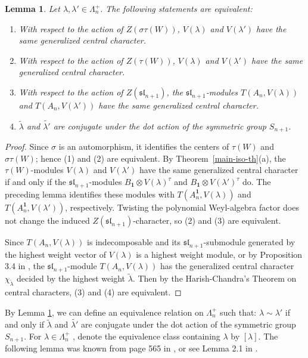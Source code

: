 \documentclass[12pt,a4paper]{amsart}
\newtheorem{lemma}[theorem]{Lemma}%
\numberwithin{equation}{section}
\def\sl{\mathfrak{sl}}
\def\b1{\mathbf{1}}
\def\l{\lambda}
\begin{document}
\begin{lemma}\label{centra-character}  Let $\l,\l'\in \Lambda_n^+$. The following statements are equivalent:
\begin{enumerate}
\item With respect to the action of $Z(\sigma\tau(W))$,  $V(\l)$ and $V(\l')$ have the same  generalized central character.
\item With respect to  the action of  $Z(\tau(W))$,  $V(\l)$ and $V(\l')$ have the same  generalized central character.
\item With respect to the action of $Z(\sl_{n+1})$, the $\sl_{n+1}$-modules $T(A_n, V(\l))$ and $T(A_n, V(\l'))$ have the same  generalized central character.
\item $\widetilde{\l}$ and $\widetilde{\l'}$ are conjugate under the dot action of the symmetric group $S_{n+1}$.
\end{enumerate}
\end{lemma}
\begin{proof}
 Since $\sigma$ is an automorphism, it identifies the centers of $\tau(W)$
and $\sigma\tau(W)$; hence (1) and (2) are equivalent. By
Theorem~\ref{main-iso-th}(a), the $\tau(W)$-modules $V(\l)$ and $V(\l')$
have the same generalized central character if and only if the
$\sl_{n+1}$-modules $B_{\b1}\otimes V(\l)^\tau$ and
$B_{\b1}\otimes V(\l')^\tau$ do. The preceding lemma identifies these
modules with $T(A_n^{\b1},V(\l))$ and $T(A_n^{\b1},V(\l'))$, respectively.
Twisting the polynomial Weyl-algebra factor does not change the induced
$Z(\sl_{n+1})$-character, so (2) and (3) are equivalent.

Since $T(A_n, V(\l))$ is indecomposable  and its $\sl_{n+1}$-submodule generated by the highest weight vector of $V(\l)$ is a  highest weight module, or by Proposition 3.4 in \cite{CG},  the $\sl_{n+1}$-module $T(A_n, V(\l))$  has the generalized central character $\chi_{\widetilde{\l}}$ decided by the highest weight  $\widetilde{\l}$.
Then by the Harish-Chandra's Theorem on central characters,  (3) and (4) are equivalent.
\end{proof}

By Lemma \ref{centra-character}, we can define an equivalence relation
on $\Lambda_n^+$ such that:  $\l \sim \l'$ if and only if $\widetilde{\l}$ and $\widetilde{\l'}$ are conjugate under the dot action of the symmetric group $S_{n+1}$. For $\l\in\Lambda_n^+$ , denote the equivalence
class containing $\l$ by $[\l]$. The following lemma was known from page 565 in \cite{M}, or see Lemma 2.1 in \cite{CG}.
\end{document}
